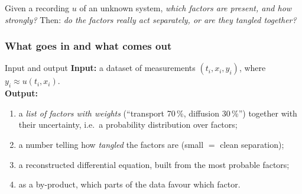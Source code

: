 \begin{ideabox}
Given a recording $u$ of an unknown system, \emph{which factors are present, and how strongly?} Then: \emph{do the factors really act separately, or are they tangled together?}
\end{ideabox}

\subsubsection*{What goes in and what comes out}
\begin{iobox}{Input and output}
\textbf{Input:} a dataset of measurements $(t_i,x_i,y_i)$, where $y_i\approx u(t_i,x_i)$.\\[2pt]
\textbf{Output:}
\begin{enumerate}[nosep,leftmargin=*]
\item a \emph{list of factors with weights} (``transport 70\,\%, diffusion 30\,\%'') together with their uncertainty, i.e.\ a probability distribution over factors;
\item a number telling how \emph{tangled} the factors are (small $=$ clean separation);
\item a reconstructed differential equation, built from the most probable factors;
\item as a by-product, which parts of the data favour which factor.
\end{enumerate}
\end{iobox}

